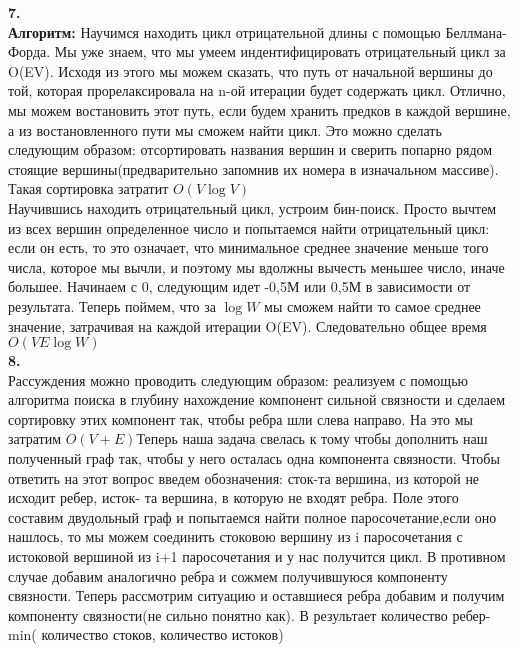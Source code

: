 \documentclass[a4paper,12pt]{article}
\begin{document}
\textbf{7.}\\
\textbf{Алгоритм:} Научимся находить цикл отрицательной длины с помощью Беллмана-Форда. Мы уже знаем, что мы умеем индентифицировать отрицательный цикл за O(EV). Исходя из этого мы можем сказать, что путь от начальной вершины до той, которая прорелаксировала  на n-ой итерации будет содержать цикл. Отлично, мы можем востановить этот путь, если будем хранить предков в каждой вершине, а из востановленного пути мы сможем найти цикл. Это можно сделать следующим образом: отсортировать названия вершин и сверить попарно рядом стоящие вершины(предварительно запомнив их номера в изначальном массиве). Такая сортировка затратит $O(V \log V)$\\
Научившись находить отрицательный цикл, устроим бин-поиск. Просто вычтем из всех вершин определенное число и попытаемся найти отрицательный цикл: если он есть, то это означает, что минимальное среднее значение меньше того числа, которое мы вычли, и поэтому мы вдолжны вычесть меньшее число, иначе большее. Начинаем с 0, следующим идет -0,5М или 0,5М в зависимости от результата. Теперь поймем, что за $\log W$ мы сможем найти то самое среднее значение, затрачивая на каждой итерации O(EV). Следовательно общее время $O(VE \log W)$\\
\textbf{8.}\\
Рассуждения можно проводить следующим образом: реализуем с помощью алгоритма поиска в глубину нахождение компонент сильной связности и сделаем сортировку этих компонент так, чтобы ребра шли слева направо. На это мы затратим $O(V+E)$Теперь наша задача свелась к тому чтобы дополнить наш полученный граф так, чтобы у него осталась одна компонента связности. Чтобы ответить на этот вопрос введем обозначения: сток-та вершина, из которой не исходит ребер, исток- та вершина, в которую не входят ребра. Поле этого составим двудольный граф и попытаемся найти полное паросочетание,если оно нашлось, то мы можем соединить стоковою вершину из i паросочетания с истоковой вершиной из i+1 паросочетания и у нас получится цикл. В противном случае добавим аналогично ребра и сожмем получившуюся компоненту связности. Теперь рассмотрим ситуацию и оставшиеся ребра добавим и получим компоненту связности(не сильно понятно как). В результает количество ребер- min( количество стоков, количество истоков)
\end{document}
